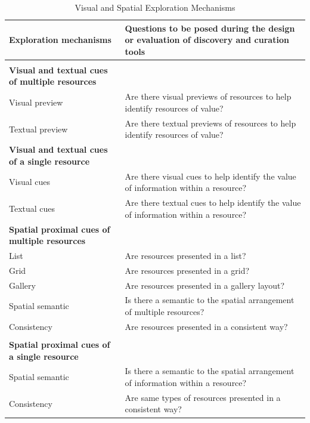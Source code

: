\documentclass{sigchi}
\begin{document}
{{\begin{table}[ht!]
\caption{Visual and Spatial Exploration Mechanisms}
\label{table:exploration} 
\begin{tabular}{|p{}| p{}|}
\hline
Exploration mechanisms & Questions to be posed during the design or evaluation of discovery and curation tools  \\
\hline
 & \\
\textbf{Visual and textual cues of multiple resources} & \\
Visual preview  & Are there visual previews of resources to help identify resources of value? \\
Textual preview & Are there textual previews of resources to help identify resources of value? \\
\textbf{Visual and textual cues of a single resource} & \\
Visual cues                 & Are there visual cues to help identify the value of information within a resource? \\
Textual cues                & Are there textual cues to help identify the value of information within a resource? \\
\textbf{Spatial proximal cues of multiple resources} & \\
List  						& Are resources presented in a list? \\
Grid   						& Are resources presented in a grid? \\
Gallery  					& Are resources presented in a gallery layout? \\
Spatial semantic            & Is there a semantic to the spatial arrangement of multiple resources? \\ 
Consistency				 	& Are resources presented in a consistent way? \\                                                    
 & \\
\textbf{Spatial proximal cues of a single resource} & \\
Spatial semantic            & Is there a semantic to the spatial arrangement of information within a resource? \\
Consistency   				& Are same types of resources presented in a consistent way?\\                                                       
\hline
\end{tabular}
\end{table}

} %

}
\end{document}
